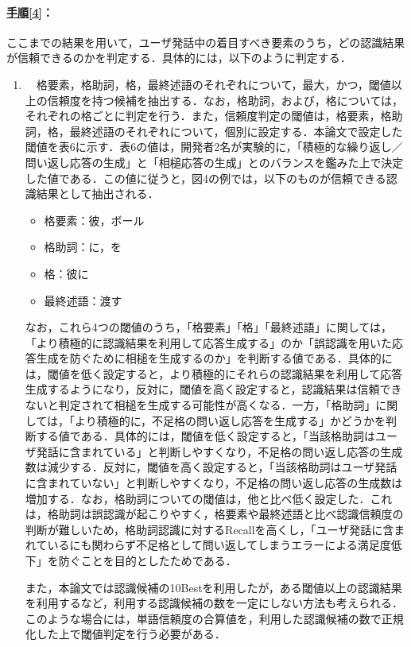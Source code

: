 \documentclass[japanese]{jnlp_1.4}
\begin{document}
\paragraph{\underline{手順[4]}：}ここまでの結果を用いて，ユーザ発話中の着目すべき要素のうち，どの認識結果が信頼できるのかを判定する．具体的には，以下のように判定する．
 
\begin{enumerate}
\item 　格要素，格助詞，格，最終述語のそれぞれについて，最大，かつ，閾値以上の信頼度を持つ候補を抽出する．なお，格助詞，および，格については，それぞれの格ごとに判定を行う．また，信頼度判定の閾値は，格要素，格助詞，格，最終述語のそれぞれについて，個別に設定する．本論文で設定した閾値を表6に示す．表6の値は，開発者2名が実験的に，「積極的な繰り返し／問い返し応答の生成」と「相槌応答の生成」とのバランスを鑑みた上で決定した値である．この値に従うと，図4の例では，以下のものが信頼できる認識結果として抽出される．

\begin{itemize}
 \item 格要素：彼，ボール
 \item 格助詞：に，を
 \item 格：彼に
 \item 最終述語：渡す
\end{itemize}
   
なお，これら4つの閾値のうち，「格要素」「格」「最終述語」に関しては，「より積極的に認識結果を利用して応答生成する」のか「誤認識を用いた応答生成を防ぐために相槌を生成するのか」を判断する値である．具体的には，閾値を低く設定すると，より積極的にそれらの認識結果を利用して応答生成するようになり，反対に，閾値を高く設定すると，認識結果は信頼できないと判定されて相槌を生成する可能性が高くなる．一方，「格助詞」に関しては，「より積極的に，不足格の問い返し応答を生成する」かどうかを判断する値である．具体的には，閾値を低く設定すると，「当該格助詞はユーザ発話に含まれている」と判断しやすくなり，不足格の問い返し応答の生成数は減少する．反対に，閾値を高く設定すると，「当該格助詞はユーザ発話に含まれていない」と判断しやすくなり，不足格の問い返し応答の生成数は増加する．なお，格助詞についての閾値は，他と比べ低く設定した．これは，格助詞は誤認識が起こりやすく\cite{no43}，格要素や最終述語と比べ認識信頼度の判断が難しいため，格助詞認識に対するRecallを高くし，「ユーザ発話に含まれているにも関わらず不足格として問い返してしまうエラーによる満足度低下」を防ぐことを目的としたためである．

また，本論文では認識候補の10Bestを利用したが，ある閾値以上の認識結果を利用するなど，利用する認識候補の数を一定にしない方法も考えられる．このような場合には，単語信頼度の合算値を，利用した認識候補の数で正規化した上で閾値判定を行う必要がある．
   

\end{enumerate}
\end{document}

